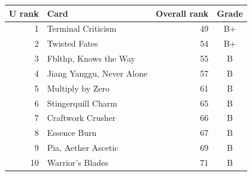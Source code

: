 \begin{tabular}{rlrc}
\toprule
U rank & Card & Overall rank & Grade \\
\midrule
1 & Terminal Criticism & 49 & B+ \\
2 & Twisted Fates & 54 & B+ \\
3 & Fblthp, Knows the Way & 55 & B \\
4 & Jiang Yanggu, Never Alone & 57 & B \\
5 & Multiply by Zero & 61 & B \\
6 & Stingerquill Charm & 65 & B \\
7 & Craftwork Crusher & 66 & B \\
8 & Essence Burn & 67 & B \\
9 & Pia, Aether Ascetic & 69 & B \\
10 & Warrior's Blades & 71 & B \\
\bottomrule
\end{tabular}

